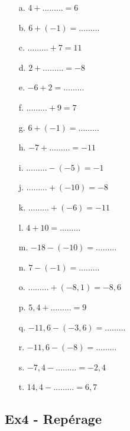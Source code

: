 \documentclass[a4paper,11pt]{article}
\begin{document}
\begin{multicols}{3}\noindent
  \begin{enumerate}
    \item[a.] $4 + \ldots\ldots\ldots = 6$
    \item[b.] $6 + \left( -1\right) = \ldots\ldots\ldots$
    \item[c.] $\ldots\ldots\ldots + 7 = 11$
    \item[d.] $2 + \ldots\ldots\ldots = -8$
    \item[e.] $-6 + 2 = \ldots\ldots\ldots$
    \item[f.] $\ldots\ldots\ldots + 9 = 7$
    \item[g.] $6 + \left( -1\right) = \ldots\ldots\ldots$
    \item[h.] $-7 + \ldots\ldots\ldots = -11$
    \item[i.] $\ldots\ldots\ldots - \left( -5\right) = -1$
    \item[j.] $\ldots\ldots\ldots + \left( -10\right) = -8$
    \item[k.] $\ldots\ldots\ldots + \left( -6\right) = -11$
    \item[l.] $4 + 10 = \ldots\ldots\ldots$
    \item[m.] $-18 - \left( -10\right) = \ldots\ldots\ldots$
    \item[n.] $7 - \left( -1\right) = \ldots\ldots\ldots$
    \item[o.] $\ldots\ldots\ldots + \left( -8,1\right) = -8,6$
    \item[p.] $5,4 + \ldots\ldots\ldots = 9$
    \item[q.] $-11,6 - \left( -3,6\right) = \ldots\ldots\ldots$
    \item[r.] $-11,6 - \left( -8\right) = \ldots\ldots\ldots$
    \item[s.] $-7,4 - \ldots\ldots\ldots = -2,4$
    \item[t.] $14,4 - \ldots\ldots\ldots = 6,7$
  \end{enumerate}
\end{multicols}

\subsection*{Ex4 - Repérage}
\end{document}

